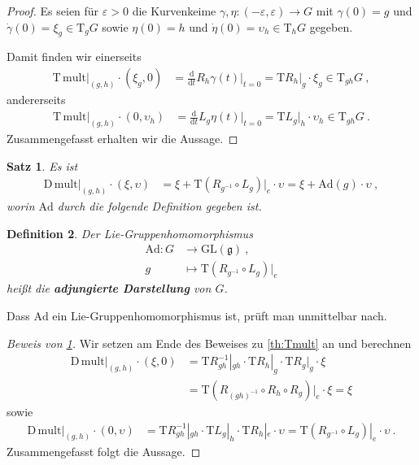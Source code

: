 \documentclass[10pt,a4paper]{article}
\theoremstyle{mytheorem}
\newtheorem{theorem}{Satz}[section]
\theoremstyle{mydefinition}
\newtheorem{definition}[theorem]{Definition}
\newcommand{\mydef}[1]{\textbf{\textit{#1}}}
\newcommand{\dt}{\mathrm{d}}
\newcommand{\Dt}{\mathrm{D}}
\newcommand{\Tt}{\mathrm{T}}
\newcommand{\Ad}{\mathrm{Ad}}
\begin{document}
\begin{proof}
Es seien für $\varepsilon>0$ die Kurvenkeime $\gamma,\eta: (-\varepsilon,\varepsilon)\rightarrow G$ mit $\gamma(0)=g$ und $\dot{\gamma}(0)=\xi_g\in\Tt_gG$ sowie $\eta(0)=h$ und $\dot{\eta}(0)=\upsilon_h\in\Tt_hG$ gegeben.

Damit finden wir einerseits
\begin{align*}
	\Tt\,\mathrm{mult}|_{(g,h)}\cdot (\xi_g, 0)
	&= \frac{\dt}{\dt t}
		R_h\gamma(t)
	\Big|_{t=0}
	= \Tt R_h|_g\cdot\xi_g
	\in \Tt_{gh}G
	\ ,
\end{align*}
andererseits
\begin{align*}
	\Tt\,\mathrm{mult}|_{(g,h)}\cdot (0, \upsilon_h)
	&= \frac{\dt}{\dt t}
		L_g\eta(t)
	\Big|_{t=0}
	= \Tt L_g|_h\cdot\upsilon_h
	\in \Tt_{gh}G
	\ .
\end{align*}
Zusammengefasst erhalten wir die Aussage.
\end{proof}

\begin{theorem}
\label{th:Dmult}
Es ist
\begin{align*}
	\Dt\,\mathrm{mult}|_{(g, h)} \cdot (\xi, \upsilon)
	&=
	\xi + \Tt(R_{g^{-1}}\circ L_g)|_e\cdot\upsilon
	=
	\xi + \Ad(g)\cdot\upsilon
	\ ,
\end{align*}
worin $\Ad$ durch die folgende Definition gegeben ist.
\end{theorem}

\begin{definition}
\label{def:Ad}
Der Lie-Gruppenhomomorphismus 
\begin{align*}
	\Ad: G&\rightarrow \mathrm{GL}(\mathfrak{g})
	\ ,\nonumber\\
	g &\mapsto
	\Tt
	(R_{g^{-1}}\circ L_g)|_e
\end{align*}
heißt die \mydef{adjungierte Darstellung} von $G$.
\end{definition}

Dass $\Ad$ ein Lie-Gruppenhomomorphismus ist, prüft man unmittelbar nach.

\begin{proof}[Beweis von \ref{th:Dmult}]
Wir setzen am Ende des Beweises zu \ref{th:Tmult} an und berechnen
\begin{align*}
	\Dt\,\mathrm{mult}|_{(g,h)}\cdot (\xi, 0)
	&= 
	\Tt R_{gh}^{-1}|_{gh}
	\cdot
	\Tt R_h|_g
	\cdot
	\Tt R_g|_g
	\cdot\xi
	\nonumber\\
	&= \Tt (R_{(gh)^{-1}}\circ R_h\circ R_g)|_e\cdot\xi
	= \xi
\end{align*}
sowie
\begin{align*}
	\Dt\,\mathrm{mult}|_{(g,h)}\cdot (0, \upsilon)
	&=
	\Tt R_{gh}^{-1}|_{gh}
	\cdot	
	\Tt L_g|_h
	\cdot
	\Tt R_h|_e
	\cdot
	\upsilon
	=
	\Tt
	(R_{g^{-1}}\circ L_g)|_e
	\cdot
	\upsilon	
	\ .
\end{align*}
Zusammengefasst folgt die Aussage.
\end{proof}
\end{document}
